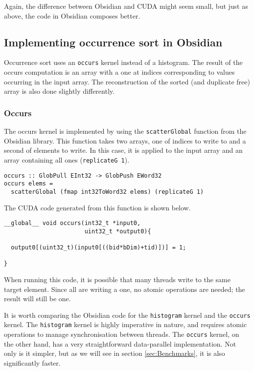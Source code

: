 Again, the difference between Obsidian and CUDA might seem small, but
just as above, the code in Obsidian composes better.

\subsection{Implementing occurrence sort in Obsidian} 
\label{sec:occur}

Occurrence sort uses an {\tt occurs} kernel instead of a 
histogram. The result of the occurs computation is an array with a one 
at indices corresponding to values occurring in the input array. The 
reconstruction of the sorted (and duplicate free) array is also done 
slightly differently.

\subsubsection{Occurs}

The occurs kernel is implemented by using the {\tt scatterGlobal} 
function from the Obsidian library. This function takes two arrays, one of 
indices to write to and a second of elements to write. In this case, it 
is applied to the input array and an array containing all ones 
({\tt replicateG 1}). 

\begin{small}
\begin{Verbatim}[samepage=true] 
occurs :: GlobPull EInt32 -> GlobPush EWord32
occurs elems = 
  scatterGlobal (fmap int32ToWord32 elems) (replicateG 1)
\end{Verbatim}
\end{small} 

The CUDA code generated from this function is shown below. 

\begin{small}
\begin{Verbatim}[samepage=true] 
__global__ void occurs(int32_t *input0,
                       uint32_t *output0){
   
  output0[(uint32_t)(input0[((bid*bDim)+tid)])] = 1;
  
}
\end{Verbatim} 
\end{small} 

When running this code, it is possible that many threads write to the same 
target element. Since all are writing a one, no atomic operations are needed; 
the result will still be one. 

It is worth comparing the Obsidian code for the {\tt histogram} kernel
and the {\tt occurs} kernel. The {\tt histogram} kernel is highly
imperative in nature, and requires atomic operations to manage
synchronisation between threads. The {\tt occurs} kernel, on the other
hand, has a very straightforward data-parallel implementation. Not only
is it simpler, but as we will see in section \ref{sec:Benchmarks}, it
is also significantly faster.

